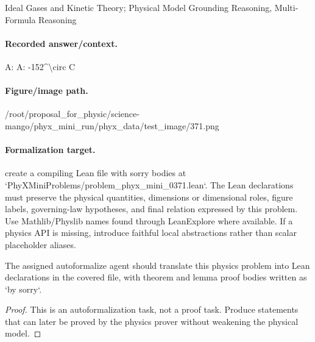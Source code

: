 Ideal Gases and Kinetic Theory; Physical Model Grounding Reasoning, Multi-Formula Reasoning

\paragraph{Recorded answer/context.}
A: A: -152\textasciicircum{}\textbackslash{}circ C

\paragraph{Figure/image path.}
/root/proposal\_for\_physic/science-mango/phyx\_mini\_run/phyx\_data/test\_image/371.png

\paragraph{Formalization target.}
create a compiling Lean file with sorry bodies at `PhyXMiniProblems/problem\_phyx\_mini\_0371.lean`. The Lean declarations must preserve the physical quantities, dimensions or dimensional roles, figure labels, governing-law hypotheses, and final relation expressed by this problem.
Use Mathlib/Physlib names found through LeanExplore where available. If a physics API is missing, introduce faithful local abstractions rather than scalar placeholder aliases.

\begin{theorem}
\label{thm:physics:phyx_mini_0371:target}
The assigned autoformalize agent should translate this physics problem into Lean declarations in the covered file, with theorem and lemma proof bodies written as `by sorry`.
\end{theorem}
\begin{proof}
This is an autoformalization task, not a proof task. Produce statements that can later be proved by the physics prover without weakening the physical model.
\end{proof}

